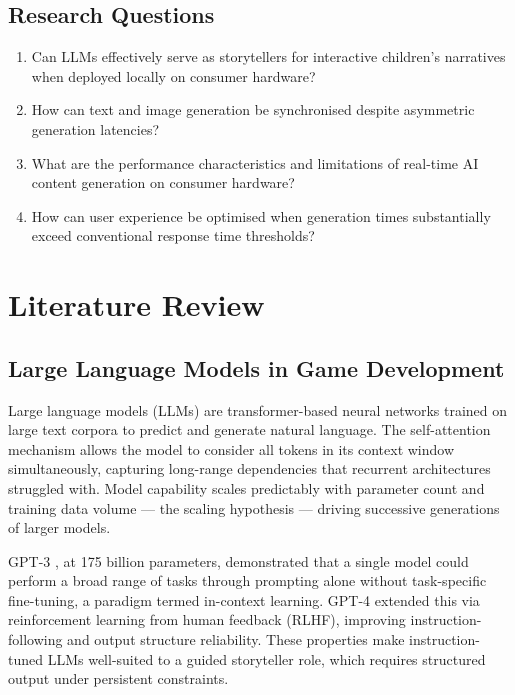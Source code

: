 \documentclass[12pt,a4paper]{article}
\begin{document}
    \subsection{Research Questions}

    \begin{enumerate}
    \item Can LLMs effectively serve as storytellers for interactive children's narratives when deployed locally on consumer hardware?
    \item How can text and image generation be synchronised despite asymmetric generation latencies?
    \item What are the performance characteristics and limitations of real-time AI content generation on consumer hardware?
    \item How can user experience be optimised when generation times substantially exceed conventional response time thresholds?
    \end{enumerate}

    \section{Literature Review}

    \subsection{Large Language Models in Game Development}

Large language models (LLMs) are transformer-based neural networks trained on large text corpora to predict and generate natural language. The self-attention mechanism allows the model to consider all tokens in its context window simultaneously, capturing long-range dependencies that recurrent architectures struggled with. Model capability scales predictably with parameter count and training data volume --- the scaling hypothesis \cite{brown2020language} --- driving successive generations of larger models.

GPT-3 \cite{brown2020language}, at 175 billion parameters, demonstrated that a single model could perform a broad range of tasks through prompting alone without task-specific fine-tuning, a paradigm termed in-context learning. GPT-4 \cite{openai2023gpt4} extended this via reinforcement learning from human feedback (RLHF), improving instruction-following and output structure reliability. These properties make instruction-tuned LLMs well-suited to a guided storyteller role, which requires structured output under persistent constraints.
\end{document}
